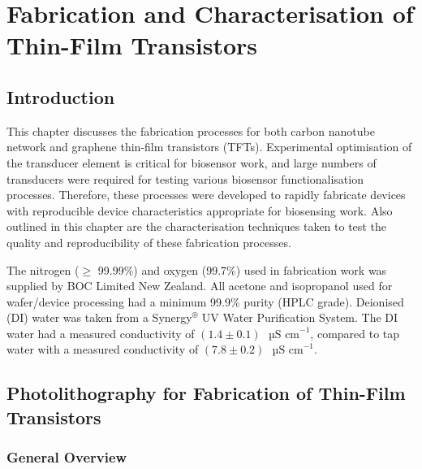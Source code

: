 \documentclass[
  a4paper,
]{scrbook}
\begin{document}

\hypertarget{sec-fabrication}{%
\chapter{Fabrication and Characterisation of Thin-Film
Transistors}\label{sec-fabrication}}

\hypertarget{introduction-2}{%
\section{Introduction}\label{introduction-2}}

This chapter discusses the fabrication processes for both carbon
nanotube network and graphene thin-film transistors (TFTs). Experimental
optimisation of the transducer element is critical for biosensor work,
and large numbers of transducers were required for testing various
biosensor functionalisation processes. Therefore, these processes were
developed to rapidly fabricate devices with reproducible device
characteristics appropriate for biosensing work. Also outlined in this
chapter are the characterisation techniques taken to test the quality
and reproducibility of these fabrication processes.

The nitrogen (\(\geq\) 99.99\%) and oxygen (99.7\%) used in fabrication
work was supplied by BOC Limited New Zealand. All acetone and
isopropanol used for wafer/device processing had a minimum 99.9\% purity
(HPLC grade). Deionised (DI) water was taken from a
Synergy\(^\circledR\) UV Water Purification System. The DI water had a
measured conductivity of \((1.4\pm0.1)\textrm{ } \textrm{µS cm}^{-1}\),
compared to tap water with a measured conductivity of
\((7.8\pm0.2)\textrm{ } \textrm{µS cm}^{-1}\).

\hypertarget{sec-photolithography}{%
\section{Photolithography for Fabrication of Thin-Film
Transistors}\label{sec-photolithography}}

\hypertarget{general-overview}{%
\subsection{General Overview}\label{general-overview}}
\end{document}
